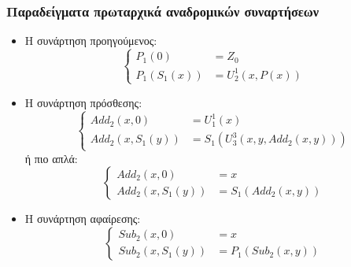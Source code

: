 \documentclass{beamer}
\begin{document}
\begin{frame}
        \frametitle{Παραδείγματα πρωταρχικά αναδρομικών συναρτήσεων}
        \begin{itemize}
                \item Η συνάρτηση προηγούμενος:
                \[
                        \left\{
                                \begin{array}{ll}
                                        P_1(0) &= Z_0\\
                                        P_1(S_1(x)) &= U^1_2(x,P(x))
                                \end{array}
                        \right.
                \]
                \pause
                \item Η συνάρτηση πρόσθεσης:
                \[
                        \left\{
                                \begin{array}{ll}
                                        Add_2(x, 0) &= U^1_1(x)\\
                                        Add_2(x, S_1(y)) &= S_1(U^3_3(x, y , Add_2(x, y)))
                                \end{array}
                        \right.
                \]
                \pause
                ή πιο απλά:
                \[
                        \left\{
                                \begin{array}{ll}
                                        Add_2(x, 0) &= x\\
                                        Add_2(x, S_1(y)) &= S_1(Add_2(x, y))
                                \end{array}
                        \right.
                \]
                \pause
                \item Η συνάρτηση αφαίρεσης:
                \[
                        \left\{
                                \begin{array}{ll}
                                        Sub_2(x, 0) &= x\\
                                        Sub_2(x, S_1(y)) &= P_1(Sub_2(x, y))
                                \end{array}
                        \right.
                \]
        \end{itemize}
\end{frame}
\end{document}
